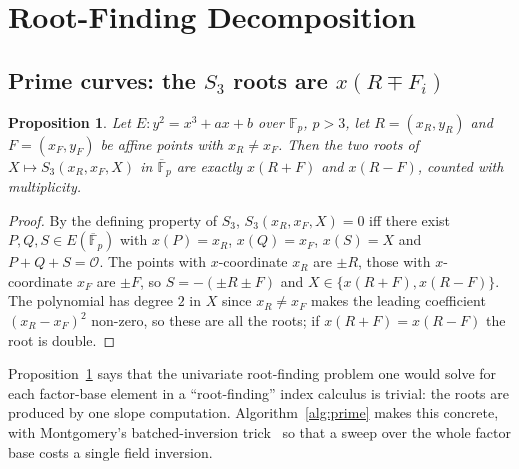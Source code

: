 \documentclass[10pt,a4paper]{article}
\newtheorem{proposition}{Proposition}
\theoremstyle{remark}
\newcommand{\FF}{\mathbb{F}}
\newcommand{\Sem}[1]{S_{#1}}
\begin{document}
\section{Root-Finding Decomposition}
\label{sec:algorithms}

\subsection{Prime curves: the $\Sem{3}$ roots are $x(R \mp F_i)$}

\begin{proposition}
\label{prop:s3roots}
Let $E: y^2 = x^3 + ax + b$ over $\FF_p$, $p > 3$, let $R = (x_R, y_R)$
and $F = (x_F, y_F)$ be affine points with $x_R \neq x_F$. Then the two
roots of $X \mapsto \Sem{3}(x_R, x_F, X)$ in $\overline{\FF}_p$ are
exactly $x(R + F)$ and $x(R - F)$, counted with multiplicity.
\end{proposition}

\begin{proof}
By the defining property of $\Sem{3}$, $\Sem{3}(x_R, x_F, X) = 0$ iff
there exist $P, Q, S \in E(\overline{\FF}_p)$ with $x(P) = x_R$,
$x(Q) = x_F$, $x(S) = X$ and $P + Q + S = \mathcal{O}$. The points with
$x$-coordinate $x_R$ are $\pm R$, those with $x$-coordinate $x_F$ are
$\pm F$, so $S = -(\pm R \pm F)$ and $X \in \{x(R+F), x(R-F)\}$. The
polynomial has degree $2$ in $X$ since $x_R \neq x_F$ makes the leading
coefficient $(x_R - x_F)^2$ non-zero, so these are all the roots; if
$x(R+F) = x(R-F)$ the root is double.
\end{proof}

Proposition~\ref{prop:s3roots} says that the univariate root-finding
problem one would solve for each factor-base element in a
``root-finding'' index calculus is trivial: the roots are produced by
one slope computation. Algorithm~\ref{alg:prime} makes this concrete,
with Montgomery's batched-inversion trick~\cite{montgomery1987} so that
a sweep over the whole factor base costs a single field inversion.
\end{document}
